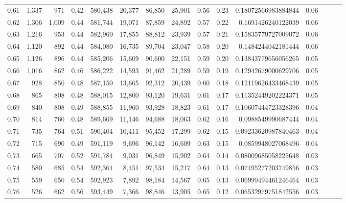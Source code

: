 \begin{tabular}{rrrrrrrrrrrrrrr}
0.61 &   1,337 &    971 &  0.42 &  580,438 &   20,377 &   86,850 &   25,901 &  0.56 &  0.23 &   0.18072566983884844 &      0.06 \\
0.62 &   1,306 &  1,009 &  0.44 &  581,744 &   19,071 &   87,859 &   24,892 &  0.57 &  0.22 &    0.1691426240122039 &      0.06 \\
0.63 &   1,216 &    953 &  0.44 &  582,960 &   17,855 &   88,812 &   23,939 &  0.57 &  0.21 &   0.15835779727009072 &      0.06 \\
0.64 &   1,120 &    892 &  0.44 &  584,080 &   16,735 &   89,704 &   23,047 &  0.58 &  0.20 &    0.1484244042181444 &      0.06 \\
0.65 &   1,126 &    896 &  0.44 &  585,206 &   15,609 &   90,600 &   22,151 &  0.59 &  0.20 &   0.13843779656056265 &      0.05 \\
0.66 &   1,016 &    862 &  0.46 &  586,222 &   14,593 &   91,462 &   21,289 &  0.59 &  0.19 &   0.12942679000629706 &      0.05 \\
0.67 &     928 &    850 &  0.48 &  587,150 &   13,665 &   92,312 &   20,439 &  0.60 &  0.18 &   0.12119626433468439 &      0.05 \\
0.68 &     865 &    808 &  0.48 &  588,015 &   12,800 &   93,120 &   19,631 &  0.61 &  0.17 &   0.11352449202224371 &      0.05 \\
0.69 &     840 &    808 &  0.49 &  588,855 &   11,960 &   93,928 &   18,823 &  0.61 &  0.17 &   0.10607444723328396 &      0.04 \\
0.70 &     814 &    760 &  0.48 &  589,669 &   11,146 &   94,688 &   18,063 &  0.62 &  0.16 &    0.0988549990687444 &      0.04 \\
0.71 &     735 &    764 &  0.51 &  590,404 &   10,411 &   95,452 &   17,299 &  0.62 &  0.15 &   0.09233620987840463 &      0.04 \\
0.72 &     715 &    690 &  0.49 &  591,119 &    9,696 &   96,142 &   16,609 &  0.63 &  0.15 &    0.0859948027068496 &      0.04 \\
0.73 &     665 &    707 &  0.52 &  591,784 &    9,031 &   96,849 &   15,902 &  0.64 &  0.14 &   0.08009685058225648 &      0.03 \\
0.74 &     580 &    685 &  0.54 &  592,364 &    8,451 &   97,534 &   15,217 &  0.64 &  0.13 &   0.07495277203749856 &      0.03 \\
0.75 &     559 &    650 &  0.54 &  592,923 &    7,892 &   98,184 &   14,567 &  0.65 &  0.13 &   0.06999494461246464 &      0.03 \\
0.76 &     526 &    662 &  0.56 &  593,449 &    7,366 &   98,846 &   13,905 &  0.65 &  0.12 &   0.06532979751842556 &      0.03 \\

\end{tabular}

